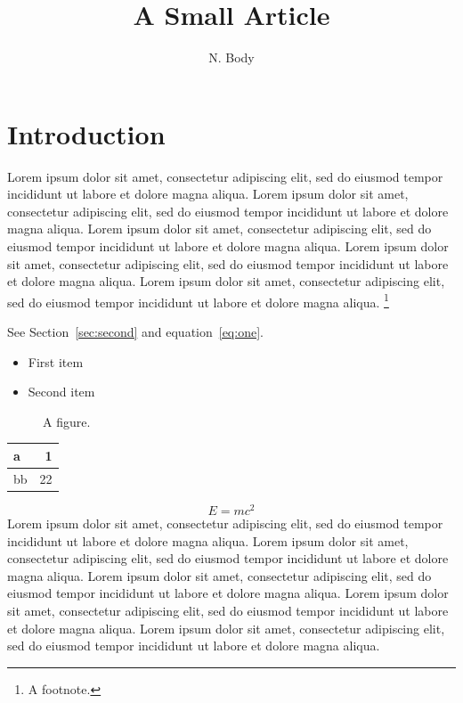 \documentclass{article}
\title{A Small Article}\author{N. Body}
\begin{document}
\maketitle
\section{Introduction}\label{sec:intro}
Lorem ipsum dolor sit amet, consectetur adipiscing elit, sed do eiusmod tempor incididunt ut labore et dolore magna aliqua. Lorem ipsum dolor sit amet, consectetur adipiscing elit, sed do eiusmod tempor incididunt ut labore et dolore magna aliqua. Lorem ipsum dolor sit amet, consectetur adipiscing elit, sed do eiusmod tempor incididunt ut labore et dolore magna aliqua. Lorem ipsum dolor sit amet, consectetur adipiscing elit, sed do eiusmod tempor incididunt ut labore et dolore magna aliqua. Lorem ipsum dolor sit amet, consectetur adipiscing elit, sed do eiusmod tempor incididunt ut labore et dolore magna aliqua. \footnote{A footnote.}

See Section~\ref{sec:second} and equation~\eqref{eq:one}.
\begin{itemize}\item First item\item Second item\end{itemize}
\begin{figure}[t]\centering\fbox{\rule{2cm}{1cm}}\caption{A figure.}\label{fig:a}\end{figure}
\begin{tabular}{|l|r|}\hline a & 1\\\hline bb & 22\\\hline\end{tabular}
\begin{equation}\label{eq:one} E=mc^2 \end{equation}
Lorem ipsum dolor sit amet, consectetur adipiscing elit, sed do eiusmod tempor incididunt ut labore et dolore magna aliqua. Lorem ipsum dolor sit amet, consectetur adipiscing elit, sed do eiusmod tempor incididunt ut labore et dolore magna aliqua. Lorem ipsum dolor sit amet, consectetur adipiscing elit, sed do eiusmod tempor incididunt ut labore et dolore magna aliqua. Lorem ipsum dolor sit amet, consectetur adipiscing elit, sed do eiusmod tempor incididunt ut labore et dolore magna aliqua. Lorem ipsum dolor sit amet, consectetur adipiscing elit, sed do eiusmod tempor incididunt ut labore et dolore magna aliqua. 
\newpage
\end{document}

